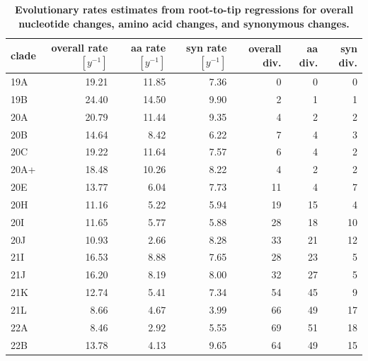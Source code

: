 \documentclass[aps,rmp, twocolumn]{revtex4}
\begin{document}
\begin{table}
\begin{tabular}{l|rrrrrr}
    \hline
    {\bf clade} &  overall rate $[y^{-1}]$ & aa rate $[y^{-1}]$ &  syn rate $[y^{-1}]$ & overall div. &  aa div. &  syn div. \\
    \hline
      19A &     19.21 &   11.85 &     7.36 &     0 &       0 &        0 \\
      19B &     24.40 &   14.50 &     9.90 &     2 &       1 &        1 \\
      20A &     20.79 &   11.44 &     9.35 &     4 &       2 &        2 \\
      20B &     14.64 &    8.42 &     6.22 &     7 &       4 &        3 \\
      20C &     19.22 &   11.64 &     7.57 &     6 &       4 &        2 \\
     20A+ &     18.48 &   10.26 &     8.22 &     4 &       2 &        2 \\
      20E &     13.77 &    6.04 &     7.73 &    11 &       4 &        7 \\
      20H &     11.16 &    5.22 &     5.94 &    19 &      15 &        4 \\
      20I &     11.65 &    5.77 &     5.88 &    28 &      18 &       10 \\
      20J &     10.93 &    2.66 &     8.28 &    33 &      21 &       12 \\
      21I &     16.53 &    8.88 &     7.65 &    28 &      23 &        5 \\
      21J &     16.20 &    8.19 &     8.00 &    32 &      27 &        5 \\
      21K &     12.74 &    5.41 &     7.34 &    54 &      45 &        9 \\
      21L &      8.66 &    4.67 &     3.99 &    66 &      49 &       17 \\
      22A &      8.46 &    2.92 &     5.55 &    69 &      51 &       18 \\
      22B &     13.78 &    4.13 &     9.65 &    64 &      49 &       15 \\
      \hline
    \end{tabular}
\caption{{\bf Evolutionary rates estimates from root-to-tip regressions for overall nucleotide changes, amino acid changes, and synonymous changes.} \label{tab:rates}}
\end{table}
\end{document}
